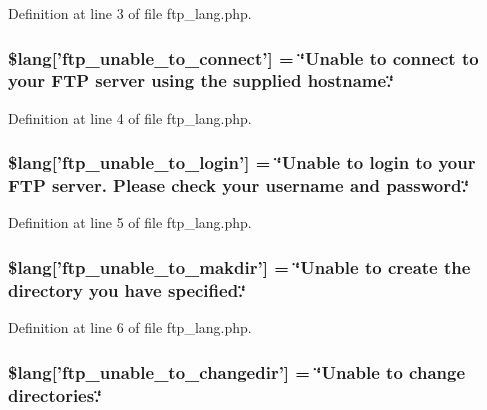 Definition at line 3 of file ftp\-\_\-lang.\-php.

\hypertarget{ftp__lang_8php_a57d51cf019dd2e380b84c6e31cda0cf5}{
\subsubsection[{\$lang}]{\setlength{\rightskip}{0pt plus 5cm}\$lang\mbox{[}'ftp\-\_\-unable\-\_\-to\-\_\-connect'\mbox{]} = \char`\"{}Unable {\bf to} connect {\bf to} your F\-T\-P server using the supplied hostname.\char`\"{}}}\label{ftp__lang_8php_a57d51cf019dd2e380b84c6e31cda0cf5}


Definition at line 4 of file ftp\-\_\-lang.\-php.

\hypertarget{ftp__lang_8php_affe13cbf898e1802abb3cd9d9ce2db97}{
\subsubsection[{\$lang}]{\setlength{\rightskip}{0pt plus 5cm}\$lang\mbox{[}'ftp\-\_\-unable\-\_\-to\-\_\-login'\mbox{]} = \char`\"{}Unable {\bf to} login {\bf to} your F\-T\-P server. Please check your username {\bf and} password.\char`\"{}}}\label{ftp__lang_8php_affe13cbf898e1802abb3cd9d9ce2db97}


Definition at line 5 of file ftp\-\_\-lang.\-php.

\hypertarget{ftp__lang_8php_a8669265afd6d483a551808d784edbd3f}{
\subsubsection[{\$lang}]{\setlength{\rightskip}{0pt plus 5cm}\$lang\mbox{[}'ftp\-\_\-unable\-\_\-to\-\_\-makdir'\mbox{]} = \char`\"{}Unable {\bf to} create the directory you have specified.\char`\"{}}}\label{ftp__lang_8php_a8669265afd6d483a551808d784edbd3f}


Definition at line 6 of file ftp\-\_\-lang.\-php.

\hypertarget{ftp__lang_8php_a2e8eab1a2d2d33cde249097df270b7df}{
\subsubsection[{\$lang}]{\setlength{\rightskip}{0pt plus 5cm}\$lang\mbox{[}'ftp\-\_\-unable\-\_\-to\-\_\-changedir'\mbox{]} = \char`\"{}Unable {\bf to} change directories.\char`\"{}}}\label{ftp__lang_8php_a2e8eab1a2d2d33cde249097df270b7df}


